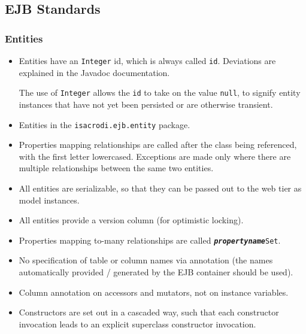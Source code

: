 \documentclass[a4paper,fleqn]{article}
\newcommand{\computercode}[1]{\texttt{#1}}
\newcommand{\computermeta}[1]{\texttt{\textbf{\textit{#1}}}}
\begin{document}
\subsection{EJB Standards}

\subsubsection{Entities}

\begin{itemize}

\item Entities have an \computercode{Integer} id, which is always
  called \computercode{id}. Deviations are explained in the Javadoc
  documentation.

  The use of \computercode{Integer} allows
  the \computercode{id} to take on the value \computercode{null}, to
  signify entity instances that have not yet been persisted or are
  otherwise transient.

\item Entities in the \computercode{isacrodi.ejb.entity} package.

\item Properties mapping relationships are called after the class
  being referenced, with the first letter lowercased. Exceptions are
  made only where there are multiple relationships between the same
  two entities.

\item All entities are serializable, so that they can be passed out to the
  web tier as model instances.

\item All entities provide a version column (for optimistic locking).

\item Properties mapping to-many relationships are called
  \computercode{\computermeta{propertyname}Set}.

\item No specification of table or column names via annotation (the
  names automatically provided / generated by the EJB container should
  be used).

\item Column annotation on accessors and mutators, not on instance
  variables.

\item Constructors are set out in a cascaded way, such that each
  constructor invocation leads to an explicit superclass constructor
  invocation.


\end{itemize}
\end{document}
